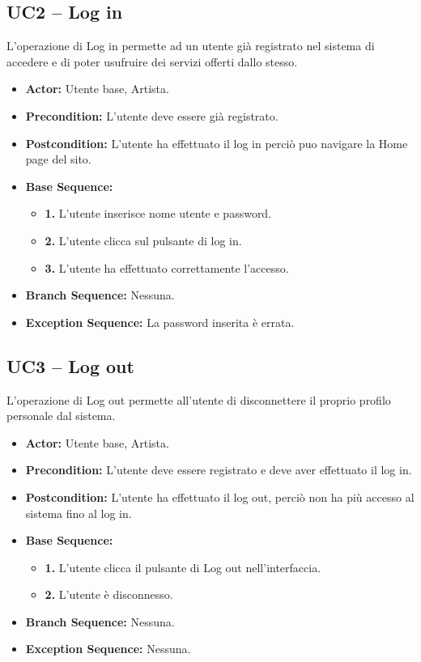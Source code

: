 \vspace{1cm}

\subsection{\textbf{UC2 -- Log in}}
L'operazione di Log in permette ad un utente già registrato nel sistema di accedere e di poter 
usufruire dei servizi offerti dallo stesso.
\begin{itemize}
    \item \textbf{Actor:} Utente base, Artista.
    \item \textbf{Precondition:} L'utente deve essere già registrato.
    \item \textbf{Postcondition:} L'utente ha effettuato il log in perciò puo navigare la Home page del sito.
    \item \textbf{Base Sequence:}
    \begin{itemize}
        \item \textbf{1.} L'utente inserisce nome utente e password.
        \item \textbf{2.} L'utente clicca sul pulsante di log in.
        \item \textbf{3.} L'utente ha effettuato correttamente l'accesso.
    \end{itemize}
    \item \textbf{Branch Sequence:} Nessuna.
    \item \textbf{Exception Sequence:} La password inserita è errata.
    

\end{itemize}

\vspace{0.5cm}

\subsection{\textbf{UC3 -- Log out}}
L'operazione di Log out permette all'utente di disconnettere il 
proprio profilo personale dal sistema.
\begin{itemize}
    \item \textbf{Actor:} Utente base, Artista.
    \item \textbf{Precondition:} L'utente deve essere registrato e deve aver 
        effettuato il log in.
    \item \textbf{Postcondition:} L'utente ha effettuato il log out, perciò non ha più accesso al sistema fino al log in.
    \item \textbf{Base Sequence:}
    \begin{itemize}
        \item \textbf{1.} L'utente clicca il pulsante di Log out nell'interfaccia.
        \item \textbf{2.} L'utente è disconnesso.
    \end{itemize}
    \item \textbf{Branch Sequence:} Nessuna.
    \item \textbf{Exception Sequence:} Nessuna.

\end{itemize}


